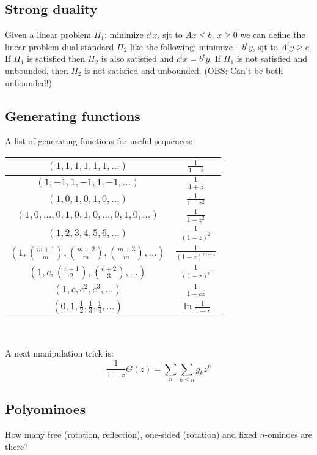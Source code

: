   \subsection{Strong duality}
  Given a linear problem $\Pi_{1}$: minimize $c^t x$, sjt to $Ax \leq b$, $x \geq 0$ we can define the linear problem dual standard $\Pi_{2}$ like the following: minimize $-b^t y$, sjt to $A^t y \geq c$. If $\Pi_{1}$ is satisfied then $\Pi_{2}$ is also satisfied and $c^t x = b^t y$. If $\Pi_{1}$ is not satisfied and unbounded, then $\Pi_{2}$ is not satisfied and unbounded. (OBS: Can't be both unbounded!)

\subsection{Generating functions}
  A list of generating functions for useful sequences:

  \begin{tabular}{|c|c|}
    \hline
    $(1,1,1,1,1,1,\ldots)$ & $\frac{1}{1-z}$ \\ \hline
    $(1,-1,1,-1,1,-1,\ldots)$ & $\frac{1}{1+z}$ \\ \hline
    $(1,0,1,0,1,0,\ldots)$ & $\frac{1}{1-z^2}$ \\ \hline
    $(1,0,\ldots,0,1,0,1,0,\ldots,0,1,0,\ldots)$ & $\frac{1}{1-z^2}$ \\ \hline
    $(1,2,3,4,5,6,\ldots)$ & $\frac{1}{(1-z)^2}$ \\ \hline
    $(1,\binom{m+1}{m},\binom{m+2}{m},\binom{m+3}{m},\ldots)$ & $\frac{1}{(1-z)^{m+1}}$ \\ \hline
    $(1,c,\binom{c+1}{2},\binom{c+2}{3},\ldots)$ & $\frac{1}{(1-z)^c}$ \\ \hline
    $(1,c,c^2, c^3, \ldots)$ & $\frac{1}{1-cz}$ \\ \hline
    $(0,1,\frac{1}{2},\frac{1}{3},\frac{1}{4},\ldots)$ & $\ln \frac{1}{1-z}$ \\ \hline
  \end{tabular}

\

A neat manipulation trick is:
\begin{equation*}
  \frac{1}{1-z}G(z) = \sum_{n}\sum_{k\leq n}g_kz^n
\end{equation*}

\subsection{Polyominoes} How many free (rotation, reflection), one-sided (rotation) and fixed $n$-ominoes are there?
      
